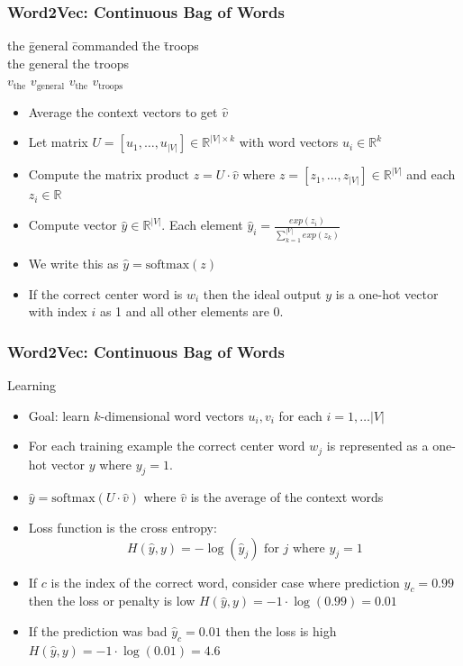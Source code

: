 \begin{frame}
\frametitle{Word2Vec: Continuous Bag of Words}
\begin{tabbing}
the \= general \= commanded \= the \= troops\kill \\
the \> general \> \rlap{\underline{\hphantom{commanded}}} \> the \> troops \\
$v_{\textrm{the}}$ \> $v_{\textrm{general}}$ \> \> $v_{\textrm{the}}$ \> $v_{\textrm{troops}}$ 
\end{tabbing}
\begin{itemize}[<+->]
	\item Average the context vectors to get $\hat{v}$
	\item Let matrix $U = [ u_1, \ldots, u_{|V|} ] \in \mathbb{R}^{|V| \times k}$ with word vectors $u_i \in \mathbb{R}^k$
	\item Compute the matrix product $z = U \cdot \hat{v}$ where $z = [ z_1, \ldots, z_{|V|} ] \in \mathbb{R}^{|V|}$ and each $z_i \in \mathbb{R}$
	\item Compute vector $\hat{y} \in \mathbb{R}^{|V|}$. Each element $\hat{y}_i = \frac{exp(z_i)}{\sum_{k=1}^{|V|} exp(z_k)} $
	\item We write this as $\hat{y} = \textrm{softmax}(z)$
	\item If the correct center word is $w_i$ then the ideal output $y$ is a one-hot vector with index $i$ as 1 and all other elements are 0.
\end{itemize}
\end{frame}

\begin{frame}
\frametitle{Word2Vec: Continuous Bag of Words}
\begin{block}{Learning}
\begin{itemize}[<+->]
	\item Goal: learn $k$-dimensional word vectors $u_i, v_i$ for each $i = 1, \ldots |V|$
	\item For each training example the correct center word $w_j$ is represented as a one-hot vector $y$ where $y_j = 1$.
	\item $\hat{y} = \textrm{softmax}(U \cdot \hat{v})$ where $\hat{v}$ is the average of the context words
	\item Loss function is the cross entropy:
	\[ H(\hat{y}, y) = - \log(\hat{y}_j) \textrm{ for $j$ where $y_j = 1$} \]
	\item If $c$ is the index of the correct word, consider case where prediction $\hat{y}_c = 0.99$ then the loss or penalty is low $H(\hat{y}, y) = - 1 \cdot \log(0.99) = 0.01$
	\item If the prediction was bad $\hat{y}_c = 0.01$ then the loss is high $H(\hat{y}, y) = - 1 \cdot \log(0.01) = 4.6$
\end{itemize}	
\end{block}
\end{frame}

